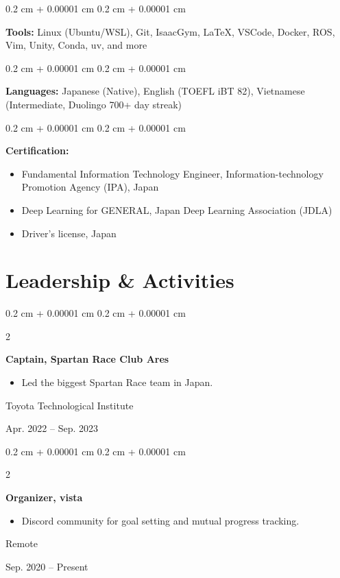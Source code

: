\documentclass[10pt, letterpaper]{article}
\newenvironment{highlights}{
    \begin{itemize}[
        topsep=0.10 cm,
        parsep=0.10 cm,
        partopsep=0pt,
        itemsep=0pt,
        leftmargin=0.4 cm + 10pt
    ]
}{
    \end{itemize}
} %
\newenvironment{onecolentry}{
    \begin{adjustwidth}{
        0.2 cm + 0.00001 cm
    }{
        0.2 cm + 0.00001 cm
    }
}{
    \end{adjustwidth}
} %
\newenvironment{twocolentry}[2][]{
    \onecolentry
    \def\secondColumn{#2}
    \setcolumnwidth{\fill, 4.5 cm}
    \begin{paracol}{2}
}{
    \switchcolumn \raggedleft \secondColumn
    \end{paracol}
    \endonecolentry
} %
\begin{document}
        \vspace{0.2 cm}

        \begin{onecolentry}
            \textbf{Tools:} Linux (Ubuntu/WSL), Git, IsaacGym, LaTeX, VSCode, Docker, ROS, Vim, Unity, Conda, uv, and more
        \end{onecolentry}

        \vspace{0.2 cm}

        \begin{onecolentry}
            \textbf{Languages:} Japanese (Native), English (TOEFL iBT 82), Vietnamese (Intermediate, Duolingo 700+ day streak)
        \end{onecolentry}

        \vspace{0.2 cm}

        \begin{onecolentry}
            \textbf{Certification:}
            \begin{highlights}
                \item Fundamental Information Technology Engineer, Information-technology Promotion Agency (IPA), Japan
                \item Deep Learning for GENERAL, Japan Deep Learning Association (JDLA)
                \item Driver's license, Japan
            \end{highlights}
        \end{onecolentry}

    \section{Leadership \& Activities}

        \begin{twocolentry}{
            Toyota Technological Institute

            Apr. 2022 -- Sep. 2023
        }
            \textbf{Captain, Spartan Race Club Ares}
            \begin{highlights}
                \item Led the biggest Spartan Race team in Japan.
            \end{highlights}
        \end{twocolentry}

        \vspace{0.2 cm}

        \begin{twocolentry}{
            Remote
            
            Sep. 2020 -- Present
        }
            \textbf{Organizer, vista}
            \begin{highlights}
                \item Discord community for goal setting and mutual progress tracking.
            \end{highlights}
        \end{twocolentry}
\end{document}
